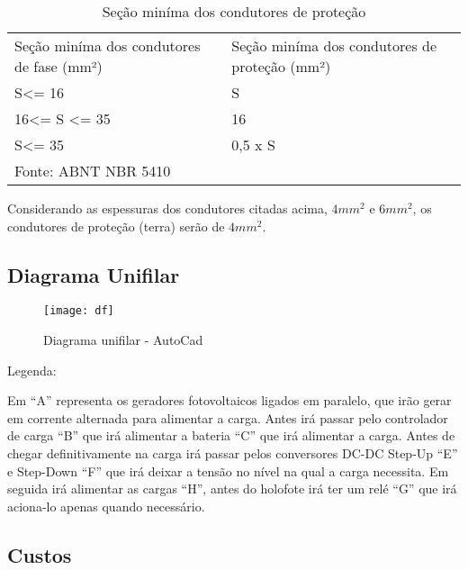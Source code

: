\begin{table}[h]
 \centering
 \caption{Seção miníma dos condutores de proteção}
 {\renewcommand\arraystretch{1.25}
 \begin{tabular}{ l l }
  \cline{1-1}\cline{2-2}  
    \multicolumn{1}{|p{4.133cm}|}{Seção miníma dos condutores de fase (mm²) \centering } &
    \multicolumn{1}{p{4.450cm}|}{Seção miníma dos condutores de proteção (mm²) \centering }
  \\  
  \cline{1-1}\cline{2-2}  
    \multicolumn{1}{|p{4.133cm}|}{S\textless = 16 \centering } &
    \multicolumn{1}{p{4.450cm}|}{S \centering }
  \\  
  \cline{1-1}\cline{2-2}  
    \multicolumn{1}{|p{4.133cm}|}{16\textless = S \textless = 35 \centering } &
    \multicolumn{1}{p{4.450cm}|}{16 \centering }
  \\  
  \cline{1-1}\cline{2-2}  
    \multicolumn{1}{|p{4.133cm}|}{S\textless = 35 \centering } &
    \multicolumn{1}{p{4.450cm}|}{0,5 x S \centering }
  \\  
  \hline
  Fonte: ABNT NBR 5410

 \end{tabular} }
\end{table}

Considerando as espessuras dos condutores citadas acima, $4mm^2$ e $6mm^2$, os condutores de proteção (terra) serão de $4mm^2$.

\subsection{Diagrama Unifilar}

\begin{figure}[H]
\centering
\texttt{[image: df]}
\caption{Diagrama unifilar - AutoCad}
\label{fig:5}
\end{figure}

Legenda:

Em “A” representa os geradores fotovoltaicos ligados em paralelo, que irão gerar em corrente alternada para alimentar a carga. Antes irá passar pelo controlador de carga “B” que irá alimentar a bateria “C” que irá alimentar a carga. Antes de chegar definitivamente na carga irá passar pelos conversores DC-DC Step-Up “E” e Step-Down “F” que irá deixar a tensão no nível na qual a carga necessita. Em seguida irá alimentar as cargas “H”, antes do holofote irá ter um relé “G” que irá aciona-lo apenas quando necessário.

\subsection{Custos}

